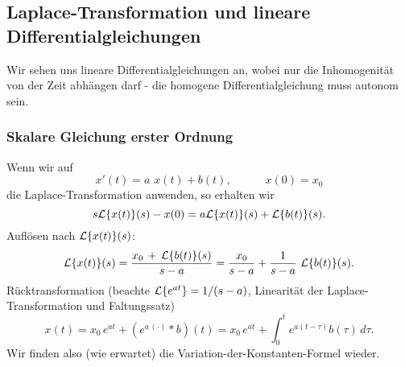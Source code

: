 


\subsection{Laplace-Transformation und lineare Differentialgleichungen}
Wir sehen uns lineare Differentialgleichungen an, wobei nur die Inhomogenit\"at
von der Zeit abh\"angen darf - die homogene Differentialgleichung muss autonom sein.

\subsubsection{Skalare Gleichung erster Ordnung}
Wenn wir auf 
$$ x'(t) = a \,\, x(t) + b(t),\qquad\quad x(0)=x_0$$
die Laplace-Transformation anwenden, so erhalten wir 
$$ s {\cal L}\{x(t)\}(s) - x(0) = a {\cal L}\{x(t)\}(s) + {\cal L}\{b(t)\}(s).$$
Aufl\"osen nach ${\cal L}\{x(t)\}(s)$:
$$ {\cal L}\{x(t)\}(s) 
= \frac{x_0\,+\,{\cal L}\{b(t)\}(s)}{s-a}
= \frac{x_0}{s-a}
+ \frac{1}{s-a}\,\, {\cal L}\{b(t)\}(s).
$$
R\"ucktransformation (beachte ${\cal L}\{e^{at}\}=1/(s-a)$, 
Linearit\"at der Laplace-Transformation und Faltungssatz)
$$ x(t) 
= x_0\, e^{at} + (e^{a\,(\cdot)}\ast b)(t) 
= x_0\, e^{at} + \int_0^t e^{a(t-\tau)} b(\tau)\, d\tau.$$
Wir finden also (wie erwartet) die Variation-der-Konstanten-Formel wieder.
\par\medskip

